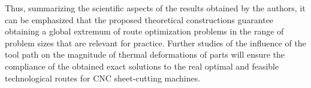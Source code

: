 \documentclass[numbers,sort&compress]{IntechOpen-Book}%
\begin{document}
Thus, summarizing the scientific aspects of the results obtained by the authors,
it can be emphasized that the proposed
theoretical constructions guarantee obtaining a global extremum of route optimization problems
in the range of problem sizes that are relevant for practice.
Further studies of the influence of the tool path on
the magnitude of thermal deformations of parts will ensure the compliance of the obtained exact solutions
to the real optimal and feasible technological routes for CNC sheet-cutting machines.

\begin{backmatter}

\begin{authordetails}

\author{A. Petunin$^{1,2}$,
  A. Chentsov$^{^2}$
  and
  P. Chentsov$^2$
}

\address[1]{Ural Federal University, Ekaterinburg, Russia}
\address[2]{N.N. Krasovskii Institute of Mathematics and Mechanics, Ekaterinburg, Russia}

\address{*Address all correspondence to: 	a.a.petunin@urfu.ru}


\end{authordetails}




\end{backmatter}
\end{document}
